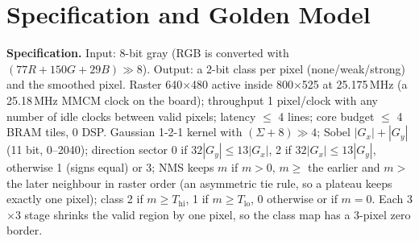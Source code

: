 \documentclass[11pt,a4paper]{article}
\begin{document}
\section{Specification and Golden Model}
\label{sec:spec}
\textbf{Specification.} Input: 8-bit gray (RGB is converted with $(77R+150G+29B)\gg 8$). Output: a 2-bit class per pixel
(none/weak/strong) and the smoothed pixel. Raster 640$\times$480 active inside 800$\times$525 at 25.175\,MHz (a 25.18\,MHz MMCM clock
on the board); throughput 1 pixel/clock with any number of idle clocks between valid pixels; latency $\le$ 4 lines;
core budget $\le$ 4 BRAM tiles, 0 DSP. Gaussian 1-2-1 kernel with $(\Sigma+8)\gg4$; Sobel $|G_x|+|G_y|$ (11 bit, 0--2040);
direction sector 0 if $32|G_y|\le13|G_x|$, 2 if $32|G_x|\le13|G_y|$, otherwise 1 (signs equal) or 3; NMS keeps $m$ if
$m>0$, $m\ge$ the earlier and $m>$ the later neighbour in raster order (an asymmetric tie rule, so a plateau keeps exactly
one pixel); class 2 if $m\ge T_\text{hi}$, 1 if $m\ge T_\text{lo}$, 0 otherwise or if $m=0$. Each 3$\times$3 stage shrinks the
valid region by one pixel, so the class map has a 3-pixel zero border.
\end{document}
